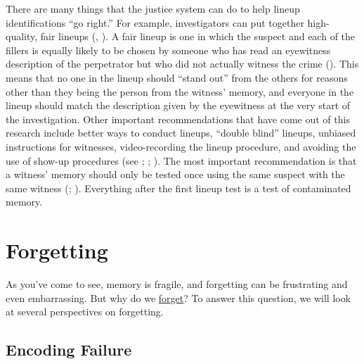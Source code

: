 \documentclass[
]{krantz}
\begin{document}
There are many things that the justice system can do to help lineup identifications ``go right.'' For example, investigators can put together high-quality, fair lineups (, ). A fair lineup is one in which the suspect and each of the fillers is equally likely to be chosen by someone who has read an eyewitness description of the perpetrator but who did not actually witness the crime (). This means that no one in the lineup should ``stand out'' from the others for reasons other than they being the person from the witness' memory, and everyone in the lineup should match the description given by the eyewitness at the very start of the investigation. Other important recommendations that have come out of this research include better ways to conduct lineups, ``double blind'' lineups, unbiased instructions for witnesses, video-recording the lineup procedure, and avoiding the use of show-up procedures (see ; ; ). The most important recommendation is that a witness' memory should only be tested once using the same suspect with the same witness (; ). Everything after the first lineup test is a test of contaminated memory.

\section{Forgetting}\label{forgetting}

As you've come to see, memory is fragile, and forgetting can be frustrating and even embarrassing. But why do we \hyperref[forgetting]{forget}? To answer this question, we will look at several perspectives on forgetting.

\subsection*{Encoding Failure}\label{encoding-failure}
\end{document}
